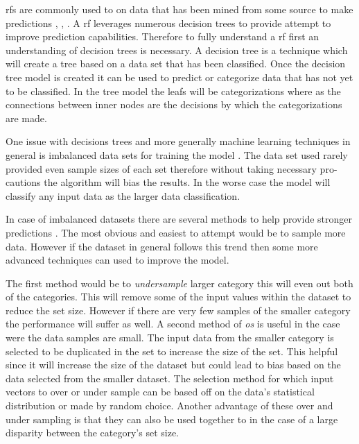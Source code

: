 \gls{rf}s are commonly used to on data that has been mined from some source to make predictions \cite{Alam2013}, \cite{Granitto2007}, \cite{Yu2011}. A \gls{rf} leverages numerous decision trees to provide attempt to improve prediction capabilities. Therefore to fully understand a \gls{rf} first an understanding of decision trees is necessary. A decision tree is a technique which will create a tree based on a data set that has been classified. Once the decision tree model is created it can be used to predict or categorize data that has not yet to be classified. In the tree model the leafs will be categorizations where as the connections between inner nodes are the decisions by which the categorizations are made.

One issue with decisions trees and more generally machine learning techniques in general is imbalanced data sets for training the model \cite{Khoshgoftaar2007}. The data set used rarely provided even sample sizes of each set therefore without taking necessary pro-cautions the algorithm will bias the results. In the worse case the model will classify any input data as the larger data classification.

In case of imbalanced datasets there are several methods to help provide stronger predictions \cite{Khoshgoftaar2007}. The most obvious and easiest to attempt would be to sample more data. However if the dataset in general follows this trend then some more advanced techniques can used to improve the model.

 
The first method would be to \textit{undersample} larger category this will even out both of the categories. This will remove some of the input values within the dataset to reduce the set size. However if there are very few samples of the smaller category the performance will suffer as well. A second method of \textit{\gls{os}} is useful in the case were the data samples are small. The input data from the smaller category is selected to be duplicated in the set to increase the size of the set. This helpful since it will increase the size of the dataset but could lead to bias based on the data selected from the smaller dataset. The selection method for which input vectors to over or under sample can be based off on the data's statistical distribution or made by random choice. Another advantage of these over and under sampling is that they can also be used together to in the case of a large disparity between the category's set size. 

